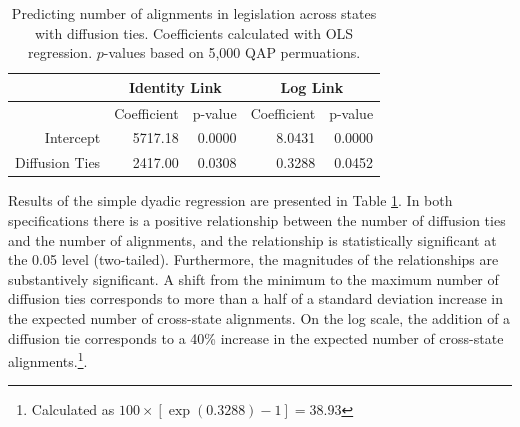 \documentclass[12pt]{article} %
\begin{document}
\begin{table}[ht]
\centering
\begin{tabular}{rrrrr}
\hline
& \multicolumn{2}{c}{Identity Link} & \multicolumn{2}{c}{Log Link} \\
  \hline
 & Coefficient & p-value & Coefficient & p-value \\ 
  \hline
Intercept & 5717.18 & 0.0000 & 8.0431 & 0.0000 \\ 
  Diffusion Ties & 2417.00 & 0.0308 & 0.3288 & 0.0452 \\ 
   \hline
\end{tabular}
\caption{Predicting number of alignments in legislation across states with diffusion ties. Coefficients calculated with OLS regression. $p$-values based on 5,000 QAP permuations.}
\label{tab:qap.diffusion}
\end{table}

Results of the simple dyadic regression are presented in Table \ref{tab:qap.diffusion}. In both specifications there is a positive relationship between the number of diffusion ties and the number of alignments, and the relationship is statistically significant at the 0.05 level (two-tailed). Furthermore, the magnitudes of the relationships are substantively significant. A shift from the minimum to the maximum number of diffusion ties corresponds to more than a half of a standard deviation increase in the expected number of cross-state alignments. On the log scale, the addition of a diffusion tie corresponds to a 40\% increase in the expected number of cross-state alignments.\footnote{Calculated as $100\times \left[ \exp(0.3288)-1\right] = 38.93$}. 
\end{document}
